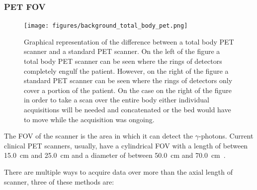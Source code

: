             \subsubsection{PET FOV} \label{sec:pet_fov}
                \begin{figure}
                    \centering
                    
                    \texttt{[image: figures/background\_total\_body\_pet.png]}
                    
                    \captionsetup{singlelinecheck=false, justification=raggedright}
                    \caption{Graphical representation of the difference between a total body \gls{PET} scanner and a standard \gls{PET} scanner. On the left of the figure a total body \gls{PET} scanner can be seen where the rings of detectors completely engulf the patient. However, on the right of the figure a standard \gls{PET} scanner can be seen where the rings of detectors only cover a portion of the patient. On the case on the right of the figure in order to take a scan over the entire body either individual acquisitions will be needed and concatenated or the bed would have to move while the acquisition was ongoing.} \label{fig:pet_fov_total_body_pet}
                \end{figure}
                
                The \gls{FOV} of the scanner is the area in which it can detect the $\gamma$-photons. Current clinical \gls{PET} scanners, usually, have a cylindrical \gls{FOV} with a length of between \SI{15.0}{\centi\metre} and \SI{25.0}{\centi\metre} and a diameter of between \SI{50.0}{\centi\metre} and \SI{70.0}{\centi\metre}~.
                
                There are multiple ways to acquire data over more than the axial length of scanner, three of these methods are:
                

